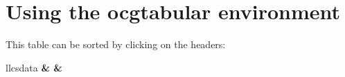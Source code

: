 \documentclass[a4paper]{ltxdoc}
\begin{document}
\section{Using the ocgtabular environment}

This table can be sorted by clicking on the headers: 

\begin{ocgtabular}{llc}{sdata}{}
\toprule%
\bfseries {}
& \bfseries   {} 
& \bfseries  {}
\\ \bottomrule%
\end{ocgtabular}
\end{document}
